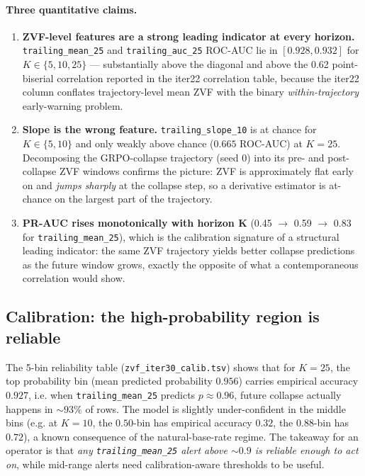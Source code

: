 \paragraph{Three quantitative claims.}
\begin{enumerate}
\item \textbf{ZVF-level features are a strong leading indicator at every horizon.}
\texttt{trailing\_mean\_25} and \texttt{trailing\_auc\_25} ROC-AUC lie in
$[0.928, 0.932]$ for $K \in \{5, 10, 25\}$ --- substantially above the diagonal
and above the 0.62 point-biserial correlation reported in the iter22
correlation table, because the iter22 column conflates trajectory-level mean
ZVF with the binary \emph{within-trajectory} early-warning problem.
\item \textbf{Slope is the wrong feature.} \texttt{trailing\_slope\_10} is at
chance for $K \in \{5, 10\}$ and only weakly above chance ($0.665$ ROC-AUC)
at $K{=}25$. Decomposing the GRPO-collapse trajectory (seed 0) into its
pre- and post-collapse ZVF windows confirms the picture: ZVF is approximately
flat early on and \emph{jumps sharply} at the collapse step, so a derivative
estimator is at-chance on the largest part of the trajectory.
\item \textbf{PR-AUC rises monotonically with horizon K} (0.45 $\to$ 0.59
$\to$ 0.83 for \texttt{trailing\_mean\_25}), which is the calibration
signature of a structural leading indicator: the same ZVF trajectory yields
better collapse predictions as the future window grows, exactly the opposite
of what a contemporaneous correlation would show.
\end{enumerate}

\subsection{Calibration: the high-probability region is reliable}
\label{sec:zvf-iter30-calib}

The 5-bin reliability table (\texttt{zvf\_iter30\_calib.tsv}) shows that
for $K{=}25$, the top probability bin (mean predicted probability
$0.956$) carries empirical accuracy $0.927$, i.e. when \texttt{trailing\_mean\_25}
predicts $p\!\approx\!0.96$, future collapse actually happens in $\sim\!93\%$
of rows. The model is slightly under-confident in the middle bins (e.g. at
$K{=}10$, the $0.50$-bin has empirical accuracy $0.32$, the $0.88$-bin has
$0.72$), a known consequence of the natural-base-rate regime. The takeaway
for an operator is that \emph{any \texttt{trailing\_mean\_25} alert above
$\sim\!0.9$ is reliable enough to act on}, while mid-range alerts need
calibration-aware thresholds to be useful.

